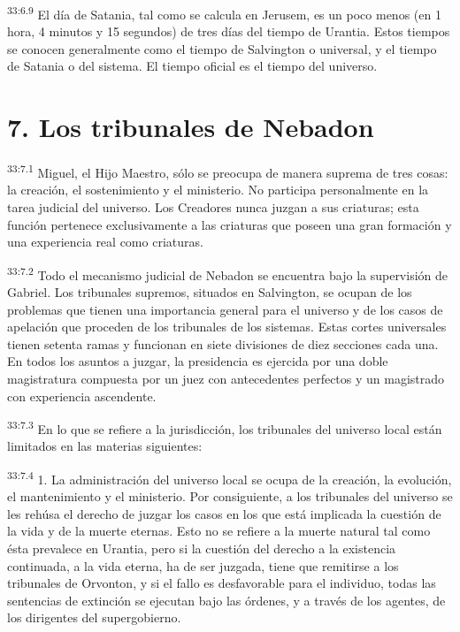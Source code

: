 \par
\textsuperscript{33:6.9} El día de Satania, tal como se calcula en Jerusem, es un poco menos (en 1 hora, 4 minutos y 15 segundos) de tres días del tiempo de Urantia. Estos tiempos se conocen generalmente como el tiempo de Salvington o universal, y el tiempo de Satania o del sistema. El tiempo oficial es el tiempo del universo.

\section*{7. Los tribunales de Nebadon}
\par
\textsuperscript{33:7.1} Miguel, el Hijo Maestro, sólo se preocupa de manera suprema de tres cosas: la creación, el sostenimiento y el ministerio. No participa personalmente en la tarea judicial del universo. Los Creadores nunca juzgan a sus criaturas; esta función pertenece exclusivamente a las criaturas que poseen una gran formación y una experiencia real como criaturas.

\par
\textsuperscript{33:7.2} Todo el mecanismo judicial de Nebadon se encuentra bajo la supervisión de Gabriel. Los tribunales supremos, situados en Salvington, se ocupan de los problemas que tienen una importancia general para el universo y de los casos de apelación que proceden de los tribunales de los sistemas. Estas cortes universales tienen setenta ramas y funcionan en siete divisiones de diez secciones cada una. En todos los asuntos a juzgar, la presidencia es ejercida por una doble magistratura compuesta por un juez con antecedentes perfectos y un magistrado con experiencia ascendente.

\par
\textsuperscript{33:7.3} En lo que se refiere a la jurisdicción, los tribunales del universo local están limitados en las materias siguientes:

\par
\textsuperscript{33:7.4} 1. La administración del universo local se ocupa de la creación, la evolución, el mantenimiento y el ministerio. Por consiguiente, a los tribunales del universo se les rehúsa el derecho de juzgar los casos en los que está implicada la cuestión de la vida y de la muerte eternas. Esto no se refiere a la muerte natural tal como ésta prevalece en Urantia, pero si la cuestión del derecho a la existencia continuada, a la vida eterna, ha de ser juzgada, tiene que remitirse a los tribunales de Orvonton, y si el fallo es desfavorable para el individuo, todas las sentencias de extinción se ejecutan bajo las órdenes, y a través de los agentes, de los dirigentes del supergobierno.

